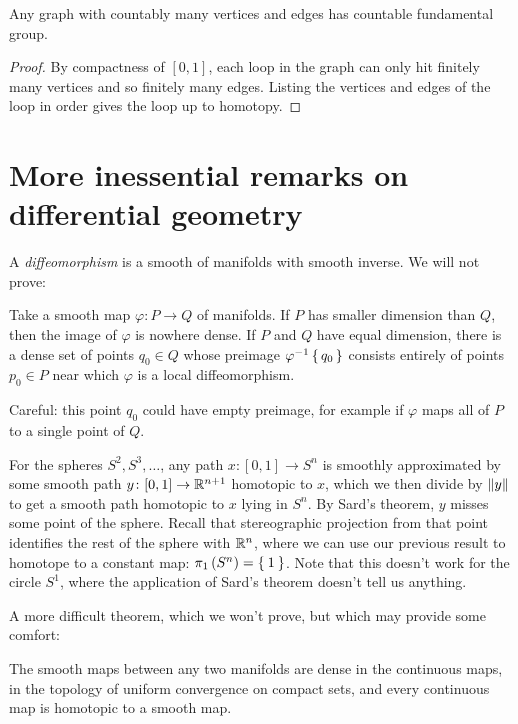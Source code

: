 \begin{lemma}
Any graph with countably many vertices and edges has countable fundamental group.
\end{lemma}
\begin{proof}
By compactness of \([0,1]\), each loop in the graph can only hit finitely many vertices and so finitely many edges.
Listing the vertices and edges of the loop in order gives the loop up to homotopy.
\end{proof}

\section{More inessential remarks on differential geometry}
A \emph{diffeomorphism} is a smooth of manifolds with smooth inverse.
We will not prove:
\begin{theorem}[Sard]
Take a smooth map \(\varphi \colon P \to Q\) of manifolds.
If \(P\) has smaller dimension than \(Q\), then the image of \(\varphi\) is nowhere dense.
If \(P\) and \(Q\) have  equal dimension, there is a dense set of points \(q_0\in Q\) whose preimage \(\varphi^{-1}\set{q_0}\) consists entirely of points \(p_0\in P\) near which \(\varphi\) is a local diffeomorphism.
\end{theorem}
Careful: this point \(q_0\) could have empty preimage, for example if \(\varphi\) maps all of \(P\) to a single point of \(Q\).
\begin{example}
For the spheres \(S^2, S^3, \dots\), any path \(x \colon [0,1] \to S^n\) is smoothly approximated by some smooth path \(y \colon [0,1] \to \mathbb{R}^{n+1}\) homotopic to \(x\), which we then divide by \(\left\|y\right\|\) to get a smooth path homotopic to \(x\) lying in \(S^n\).
By Sard's theorem, \(y\) misses some point of the sphere.
Recall that stereographic projection from that point identifies the rest of the sphere with \(\mathbb{R}^{n}\), where we can use our previous result to homotope to a constant map: \(\pi_{1}\left(S^n\right)=\Set{1}\).
Note that this doesn't work for the circle \(S^1\), where the application of Sard's theorem doesn't tell us anything.
\end{example}
A more difficult theorem, which we won't prove, but which may provide some comfort:
\begin{theorem}
The smooth maps between any two manifolds are dense in the continuous maps, in the topology of uniform convergence on compact sets, and every continuous map is homotopic to a smooth map.
\end{theorem}

